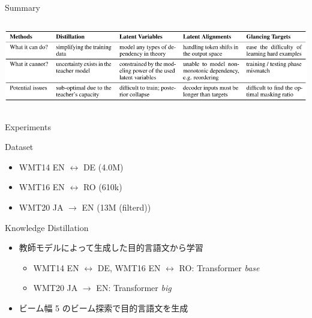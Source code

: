 \documentclass[unicode, 12pt, xdvipdfmx, aspectratio=43]{beamer}
\begin{document}
\begin{frame}[label={sec:orgdb5043c}]{Summary}
\begin{columns}
\begin{column}{1.15\columnwidth}
\begin{center}
\includegraphics[width=\linewidth]{./figure/Table1.pdf}
\end{center}
\end{column}
\end{columns}
\end{frame}

\begin{frame}[label={sec:orgc35dc6f}]{Experiments}
\begin{block}{Dataset}
\begin{itemize}
\item WMT14 EN \(\leftrightarrow\) DE (4.0M)
\item WMT16 EN \(\leftrightarrow\) RO (610k)
\item WMT20 JA \(\rightarrow\) EN (13M (filterd))
\end{itemize}
\end{block}

\begin{block}{Knowledge Distillation}
\begin{itemize}
\item 教師モデルによって生成した目的言語文から学習
\begin{itemize}
\item WMT14 EN \(\leftrightarrow\) DE, WMT16 EN \(\leftrightarrow\) RO: Transformer \textit{base}
\item WMT20 JA \(\rightarrow\) EN: Transformer \textit{big}
\end{itemize}
\item ビーム幅 5 のビーム探索で目的言語文を生成
\end{itemize}
\end{block}
\end{frame}
\end{document}
